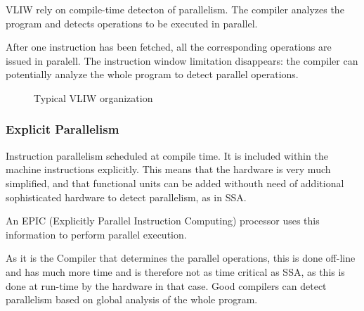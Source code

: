VLIW rely on compile-time detecton of parallelism. The compiler analyzes the program and detects operations to be executed in parallel.
  
After one instruction has been fetched, all the corresponding operations are issued in paralell. The instruction window limitation disappears: the compiler can potentially analyze the whole program to detect parallel operations.

\begin{figure}[H]
  \centering
  \caption{Typical VLIW organization}
  \label{fig:vliw-org}
\end{figure}

\subsubsection{Explicit Parallelism}
Instruction parallelism scheduled at compile time. It is included within the machine instructions explicitly. This means that the hardware is very much simplified, and that functional units can be added withouth need of additional sophisticated hardware to detect parallelism, as in SSA.

An EPIC (Explicitly Parallel Instruction Computing) processor uses this information to perform parallel execution.

As it is the Compiler that determines the parallel operations, this is done off-line and has much more time and is therefore not as time critical as SSA, as this is done at run-time by the hardware in that case. Good compilers can detect parallelism based on global analysis of the whole program.

